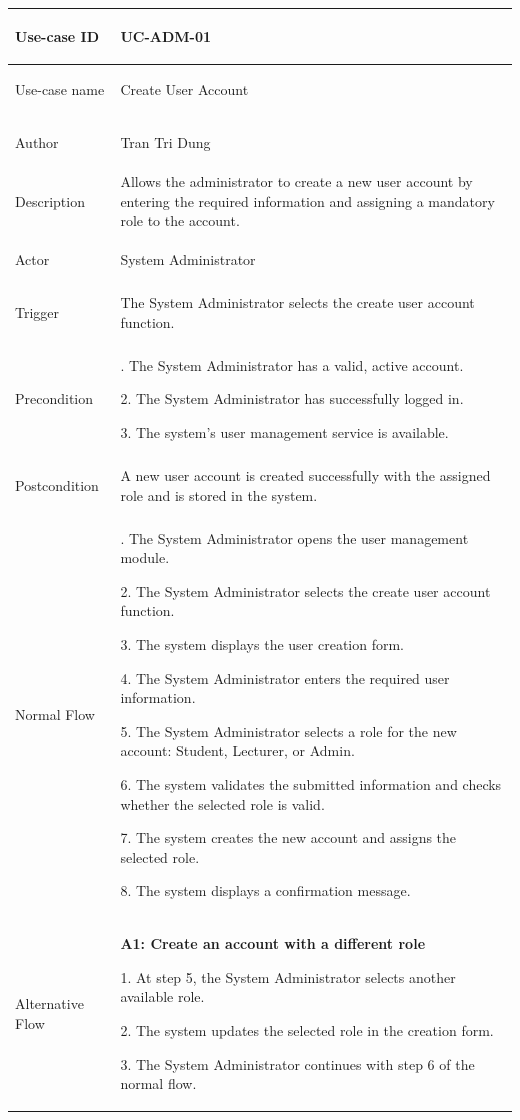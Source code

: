 \begin{longtable}{|>{\bfseries\raggedright\arraybackslash}p{}|>{\raggedright\arraybackslash}p{}|}
\hline
Use-case ID & UC-ADM-01 \\ \hline
Use-case name & Create User Account \\ \hline
Author & Tran Tri Dung \\ \hline
Description & Allows the administrator to create a new user account by entering the required information and assigning a mandatory role to the account. \\ \hline
Actor & System Administrator \\ \hline
Trigger & The System Administrator selects the create user account function. \\ \hline
Precondition &
1. The System Administrator has a valid, active account. \par
2. The System Administrator has successfully logged in. \par
3. The system's user management service is available. \\ \hline
Postcondition & A new user account is created successfully with the assigned role and is stored in the system. \\ \hline
Normal Flow &
1. The System Administrator opens the user management module. \par
2. The System Administrator selects the create user account function. \par
3. The system displays the user creation form. \par
4. The System Administrator enters the required user information. \par
5. The System Administrator selects a role for the new account: Student, Lecturer, or Admin. \par
6. The system validates the submitted information and checks whether the selected role is valid. \par
7. The system creates the new account and assigns the selected role. \par
8. The system displays a confirmation message. \\ \hline
Alternative Flow &
\textbf{A1: Create an account with a different role} \par
1. At step 5, the System Administrator selects another available role. \par
2. The system updates the selected role in the creation form. \par
3. The System Administrator continues with step 6 of the normal flow. \\ \hline

\end{longtable}
